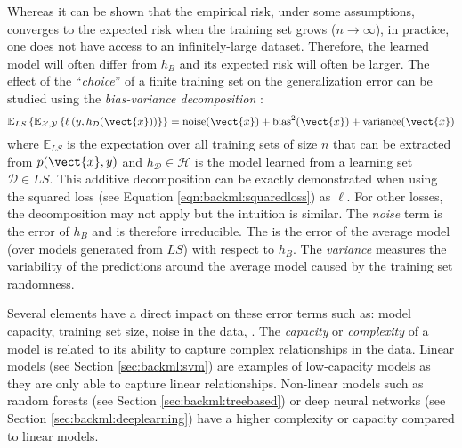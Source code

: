 Whereas it can be shown that the empirical risk, under some assumptions, converges
to the expected risk when the training set grows ($n \rightarrow \infty$), in
practice, one does not have access to an infinitely-large dataset. Therefore, the
learned model will often differ from $h_B$ and its expected risk will often be
larger. The effect of the ``\textit{choice}'' of a finite training set on the
generalization error can be studied using the \textit{bias-variance decomposition} 
\cite{geman1992neural, geurts2009bias, hastie2017elements}:
\begin{equation}
\label{eqn:backml:biasvariancedec}
\mathbb{E}_{LS}\left\{\mathbb{E}_{\mathcal{X},\mathcal{Y}}\left\{\ell\left(y, h_{\mathcal{D}}(\vect{x})\right)\right\}\right\} = \text{noise}(\vect{x}) + \text{bias}^2(\vect{x}) + \text{variance}(\vect{x})
\end{equation}
where $\mathbb{E}_{LS}$ is the expectation over all training sets of size $n$ that
can be extracted from $p(\vect{x},y)$ and $h_{\mathcal{D}} \in \mathcal{H}$ is
the model learned from a learning set $\mathcal{D} \in LS$. This additive 
decomposition can be exactly demonstrated when using the squared loss (see Equation 
\ref{eqn:backml:squaredloss}) as $\ell$. For other losses, the decomposition may not apply
but the intuition is similar. The \textit{noise}
term is the error of $h_B$ and is therefore irreducible. The  is the
error of the average model (over models generated from $LS$) with respect to $h_B$.
The \textit{variance} measures the variability of the predictions around the
average model caused by the training set randomness.

Several elements have a direct impact on these error terms such as: model capacity, 
training set size, noise in the data, \etc. The \textit{capacity} or 
\textit{complexity} of a model is related to its ability to capture complex relationships 
in the data. Linear models (see Section \ref{sec:backml:svm}) are examples of low-capacity 
models as they are only able to capture linear relationships. Non-linear models such as 
random forests (see Section \ref{sec:backml:treebased}) or deep neural networks 
(see Section \ref{sec:backml:deeplearning}) have a higher complexity or capacity 
compared to linear models.

